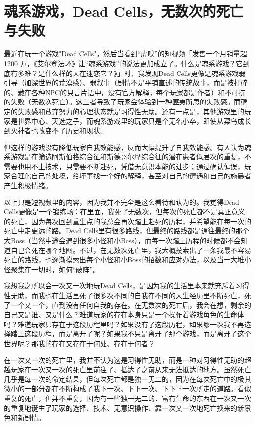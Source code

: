 \chapter{魂系游戏，Dead Cells，无数次的死亡与失败}





最近在玩一个游戏"Dead Cells"，然后当看到“虎嗅”的短视频「发售一个月销量超 1200 万，《艾尔登法环》让“魂系游戏”的说法更加成立了。什么是魂系游戏？它到底有多难？是什么样的人在迷恋它？》」时，我发现Dead Cells更像是魂系游戏\pozhehao{}弱引导（加深世界的荒漠感）、弱叙事（剧情不是平铺直述的传统故事，而是被打碎的、藏在各种NPC的只言片语中，没有官方解释，每个玩家都是作者）和不可抗的失败（无数次死亡）。这三者导致了玩家会体验到一种匪夷所思的失败感。而确定的失败感和放弃努力的心理状态就是习得性无助。还有一点是，其他游戏里的玩家是世界中心、天选之子，而魂系游戏里的玩家只是个无名小卒，即使从菜鸟成长到灭神者也改变不了历史和现状。

但这样的游戏没有降低玩家自我效能感，反而大幅提升了自我效能感。有人认为魂系游戏是在筛选阿斯伯格综合征和斯德哥尔摩综合征的潜在患者\pozhehao{}低层次的重复，不需要也用不上技术，只需要不断赴死，凭借无意识本能的进步；通过确认偏误，玩家合理化自己的处境，给坏事找一个好的解释，甚至对自己的遭遇和自己的施暴者产生积极情绪。

以上只是短视频里的内容，因为我并不完全是这么看待和认为的。我觉得Dead Cells更像是一个锻练场：在里面，我死了无数次，但每次的死亡都不是真正意义的死亡，因为每次回到重生点的我总会再次踏上赴死的历程，并希望能在每一次的死亡中走更远的路。Dead Cells里有很多路线，但最终的路线都是通往最终的那个大Boss（当然中途会遇到很多小怪和小Boss），而每一次踏上历程的时候都不会知道自己会死在哪个地图。不过，在无数次死亡里，我大概摸索出了一条我最不容易死亡的路线，也逐渐摸索出每个小怪和小Boss的招数和应对办法，以及当一大堆小怪聚集在一切时，如何“破阵”。

我想我之所以会一次又一次地玩Dead Cells，是因为我的生活里本来就充斥着习得性无助，而我也在生活里死了很多次\pozhehao{}不同的自我在不同的人生经历里不断死亡，死了一个又一个，直到没有任何自我的存在。在无数次的死亡后，我会在想，剩余的自己又是谁、又是什么？难道玩家的存在本身只是一个操作着游戏角色的生命体吗？难道玩家只存在于这段历程里吗？如果没有了这段历程，如果哪一次我不再选择踏上这段历程，而是离开了呢？如果我不只是离开了那个游戏，而是离开了这个世界呢？那我的存在又存在于何处、存在于何者？

在一次又一次的死亡里，我并不认为这是习得性无助，而是一种对习得性无助的超越\pozhehao{}玩家在一次又一次的死亡里前往了、抵达了之前从来无法抵达的地方。虽然死亡几乎是每一次的命定结果，但每次死亡都是独一无二的，因为在每次死亡中的极其微小的一部分都在不断构成了我下一次、下下一次、下下下一次所走的道路。看似重复的死亡，但并不重复，因为有一些独一无二的、富有生命的东西在一次又一次的重复地诞生了\pozhehao{}玩家的选择、技术、无意识操作、靠一次又一次地死亡换来的新景色和新剧情。

